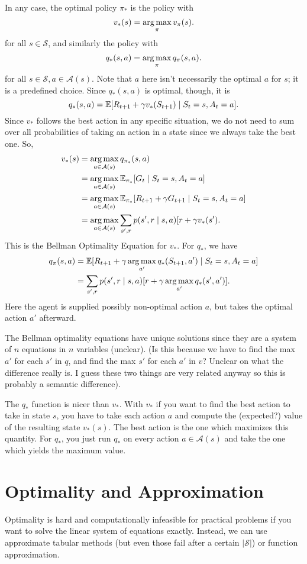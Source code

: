 \documentclass[a4paper]{report}
\begin{document}
In any case, the optimal policy $\pi_*$ is the policy with
\[
  v_*(s) = \operatorname*{arg\,max}_{\pi}v_{\pi}(s)
.\] 
for all $s \in \mathcal{S}$, and similarly the policy with
\[
  q_*(s,a) = \operatorname*{arg\,max}_{\pi}q_{\pi}(s,a)
.\] 
for all $s \in \mathcal{S}, a \in \mathcal{A}(s)$. Note that $a$ here isn't necessarily the optimal $a$ for $s$; it is a predefined choice. Since $q_{*}(s,a)$ is optimal, though, it is
\[
  q_*(s,a) = \mathbb{E}[R_{t+1} + \gamma v_*(S_{t+1}) \mid S_t=s, A_t=a]
.\] 
Since $v_{*}$ follows the best action in any specific situation, we do not need to sum over all probabilities of taking an action in a state since we always take the best one. So,
\begin{equation}
  \begin{aligned}  
    v_{*}(s) {}   & = \operatorname*{arg\,max}_{a\in\mathcal{A}(s)} q_{\pi_*}(s,a) \\
                  & = \operatorname*{arg\,max}_{a\in\mathcal{A}(s)} \mathbb{E}_{\pi_*}[G_t \mid S_t=s, A_t=a] \\
                  & = \operatorname*{arg\,max}_{a\in\mathcal{A}(s)} \mathbb{E}_{\pi_*}[R_{t+1} + \gamma G_{t+1} \mid S_t=s, A_t=a] \\
                  & = \operatorname*{arg\,max}_{a\in\mathcal{A}(s)} \sum_{s',r}p(s',r \mid s,a)[r+ \gamma v_*(s')
 .\end{aligned}
\end{equation}
This is the Bellman Optimality Equation for $v_*$. For $q_*$, we have
\begin{equation}
  \begin{aligned}
    q_{\pi}(s,a) {} & = \mathbb{E}[R_{t+1} + \gamma \operatorname*{arg\,max}_{a'}q_*(S_{t+1},a') \mid S_t=s, A_t=a] \\
                  & = \sum_{s',r} p(s',r \mid s,a)[r + \gamma \operatorname*{arg\,max}_{a'}q_*(s',a')]
  .\end{aligned}
\end{equation}
Here the agent is supplied possibly non-optimal action $a$, but takes the optimal action $a'$ afterward.

The Bellman optimality equations have unique solutions since they are a system of $n$ equations in $n$ variables (unclear). (Is this because we have to find the max $a'$ for each $s'$ in $q$, and find the max $s'$ for each $a'$ in $v$? Unclear on what the difference really is. I guess these two things are very related anyway so this is probably a semantic difference).

The $q_*$ function is nicer than $v_*$. With $v_*$ if you want to find the best action to take in state $s$, you have to take each action $a$ and compute the (expected?) value of the resulting state $v_*(s)$. The best action is the one which maximizes this quantity. For $q_*$, you just run $q_*$ on every action $a \in \mathcal{A}(s)$ and take the one which yields the maximum value.

\section{Optimality and Approximation}
Optimality is hard and computationally infeasible for practical problems if you want to solve the linear system of equations exactly. Instead, we can use approximate tabular methods (but even those fail after a certain $|\mathcal{S}|$) or function approximation.
\end{document}
